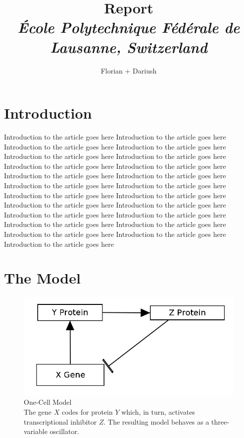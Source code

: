 \documentclass[10pt,a4paper,oneside,twocolumn]{article}
\numberwithin{equation}{section} %
\begin{document}
\title{\huge{\textbf{Report}}\\
	\vspace{0.5cm}
	\Large{\textit{\'Ecole Polytechnique F\'ed\'erale de Lausanne, Switzerland}}}
\author{\large{Florian + Dariush}}

\begin{titlepage}
 \maketitle
\thispagestyle{empty}
\end{titlepage}

\section{Introduction}
    Introduction to the article goes here    Introduction to the article goes here  Introduction to the article goes here  Introduction to the article goes here  Introduction to the article goes here  Introduction to the article goes here  Introduction to the article goes here  Introduction to the article goes here  Introduction to the article goes here  Introduction to the article goes here  Introduction to the article goes here  Introduction to the article goes here  Introduction to the article goes here  Introduction to the article goes here  Introduction to the article goes here  Introduction to the article goes here  Introduction to the article goes here  Introduction to the article goes here  Introduction to the article goes here  Introduction to the article goes here  Introduction to the article goes here  Introduction to the article goes here Introduction to the article goes here \\

\section{The Model}

    \begin{figure}[!h]
	\centering
	\includegraphics[scale=0.3]{sketch.png}
	\caption{
	    One-Cell Model\\
	The gene $X$ codes for protein $Y$ which, in turn, activates transcriptional inhibitor $Z$. The resulting model behaves as a three-variable oscillator.
	}
    \end{figure}
    
\end{document}
